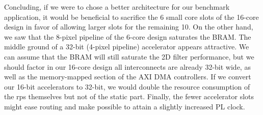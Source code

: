 Concluding, if we were to chose a better architecture for our benchmark application,
it would be beneficial to sacrifice the 6 small core slots of the 16-core design 
in favor of allowing larger slots for the remaining 10.
On the other hand, we saw that the 8-pixel pipeline of the 6-core design saturates the BRAM.
The middle ground of a 32-bit (4-pixel pipeline) accelerator appears attractive.
We can assume that the BRAM will still saturate the 2D filter performance, but we should factor in
our 16-core design all interconnects are already 32-bit wide, as well as the memory-mapped section of the AXI DMA controllers.
If we convert our 16-bit accelerators to 32-bit, we would double the resource consumption of the \glspl{rp} themselves but
not of the static part. Finally, the fewer accelerator slots might ease routing and make possible to attain a slightly increased PL clock.

